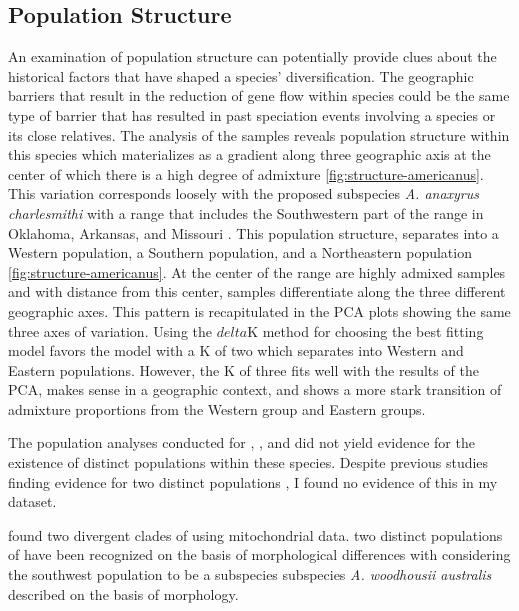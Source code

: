 \subsection{Population Structure}
An examination of population structure can potentially provide clues about the 
historical factors that have shaped a species' diversification.
The geographic barriers that result in the reduction of gene flow within species
could be the same type of barrier that has resulted in past speciation events 
involving a species or its close relatives.
The \structure analysis of the \amer samples reveals population structure within 
this species which materializes as a gradient along three geographic axis at the center of  
which there is a high degree of admixture \cref{fig:structure-americanus}.
This variation corresponds loosely with the proposed subspecies 
\textit{A. anaxyrus charlesmithi} with a range that includes the Southwestern 
part of the \amer range in Oklahoma, Arkansas, and Missouri \parencite{bragg1954}.
This population structure, separates \amer into a Western population, a Southern population, and
a Northeastern population \cref{fig:structure-americanus}.
At the center of the range are highly admixed samples and with distance from 
this center, samples differentiate along the three different geographic axes.
This pattern is recapitulated in the PCA plots showing the same three axes of 
variation. 
Using the $delta$K method for choosing the best fitting \structure model  
favors the model with a K of two which separates \amer into Western and Eastern
populations. 
However, the K of three fits well with the results of the PCA, 
makes sense in a geographic context, and shows a more stark transition of 
admixture proportions from the Western group and Eastern groups.



The population \structure analyses conducted for \fowl, \terr, and \wood  
did not yield evidence for the existence of distinct populations within these 
species. 
Despite previous studies finding evidence for two distinct \wood populations 
\cite{masta2003,shannon1955}, I found \wood no evidence of this in my dataset.






\cite{masta2003} found two divergent clades of \wood using mitochondrial data.
\cite{conant1998} two distinct populations of \wood have been recognized on 
the basis of morphological differences with considering the southwest population
to be a subspecies 
\cite{shannon1955} subspecies \textit{A. woodhousii australis} described on the  
basis of morphology.

